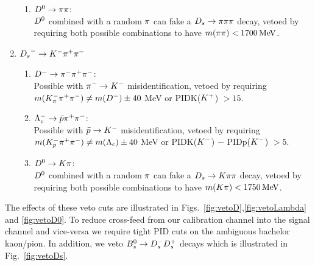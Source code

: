 \begin{enumerate}
\begin{enumerate}
	\item ${{D}^0}\rightarrow{\ensuremath{\pi}}{\ensuremath{\pi}}$: \\
	${{D}^0}$ combined with a random ${\pi}$ can fake a ${{D}_{s}}\rightarrow{\ensuremath{\pi}}{\ensuremath{\pi}}{\ensuremath{\pi}}$ decay, 
		vetoed by requiring both possible combinations to have $m({\pi}{\pi}) < 1700 \mathrm{\,Me\kern -0.1em V}$.
\end{enumerate}

\item ${{D}_{s}}^- \rightarrow K^- {\pi}^+{\pi}^-$

\begin{enumerate}


	\item ${{D}^-} \rightarrow{\ensuremath{{\pi}^-}}{\ensuremath{{\pi}^+}}{\ensuremath{{\pi}^-}}$:  \\
	Possible with ${{\pi}^-}\rightarrow{\ensuremath{{K}^-}}$ misidentification, vetoed by requiring 
	$m(K^-_\pi {\ensuremath{{\pi}^+}} {\ensuremath{{\pi}^-}}) \ne m(D^-) \pm 40$ MeV 
	or PIDK(${{K}^+}$) $> 15$.
	
	
	\item $\Lambda_c^- \rightarrow \bar p {{\pi}^+} {{\pi}^-} $: \\
	Possible with $\bar p \rightarrow {\ensuremath{{K}^-}}$ misidentification, vetoed by requiring
	$m(K^-_p {{\pi}^+} {{\pi}^-}) \ne m(\Lambda_c) \pm 40$ MeV
	or PIDK(${{K}^-}$) $-$ PIDp(${{K}^-}$) $> 5$.
	
	\item ${{D}^0}\rightarrow{\ensuremath{K}}{\ensuremath{\pi}}$: \\
	${{D}^0}$ combined with a random ${\pi}$ can fake a ${{D}_{s}}\rightarrow{\ensuremath{K}}{\ensuremath{\pi}}{\ensuremath{\pi}}$ decay, 
		vetoed by requiring both possible combinations to have $m({K}{\pi}) < 1750 \mathrm{\,Me\kern -0.1em V}$.
\end{enumerate}

\end{enumerate}
The effects of these veto cuts are illustrated in Figs.~\ref{fig:vetoD},\ref{fig:vetoLambda} and \ref{fig:vetoD0}.
To reduce cross-feed from our calibration channel into the signal channel and vice-versa we require tight PID cuts on the ambiguous bachelor kaon/pion. 
In addition, we veto ${{B}^0_{s}}\rightarrow{\ensuremath{{D}^-_{s}}}{\ensuremath{{D}^+_{s}}}$ decays which is illustrated in Fig.~\ref{fig:vetoDs}.
 \clearpage

